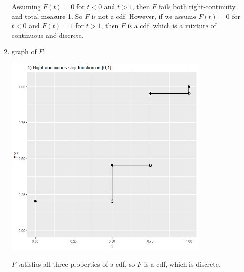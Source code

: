 \documentclass[12pt]{article}
\newenvironment{problem}[2][Problem]{\begin{trivlist}
\item[\hskip \labelsep {\bfseries #1}\hskip \labelsep {\bfseries #2.}]}
{\end{trivlist}}
\begin{document}
\begin{problem}{3}
\begin{enumerate}
\begin{center}
    \end{center}
    Assuming $F(t) = 0$ for $t < 0$ and $t > 1$, 
    then $F$ fails both right-continuity and total measure 1.
    So $F$ is not a cdf. However, if we assume $F(t) = 0$ for $t < 0$
    and $F(t) = 1$ for $t > 1$, then $F$ is a cdf, which is a mixture of
    continuous and discrete.
    \pagebreak
    \item graph of $F$:
    \begin{center}
      \includegraphics[width=0.8\textwidth]{3d.png}
    \end{center}
    $F$ satisfies all three properties of a cdf, so $F$ is a cdf,
    which is discrete.
  \end{enumerate}
\end{problem}
\end{document}
